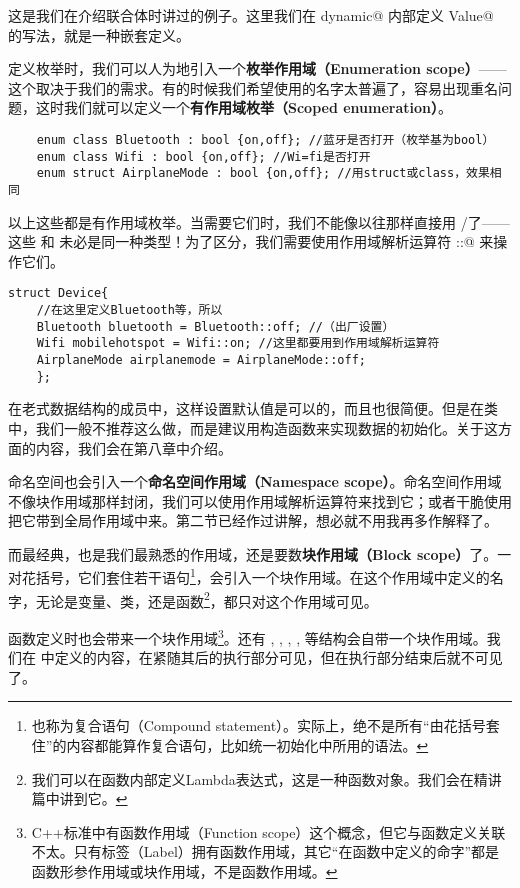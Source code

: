这是我们在介绍联合体时讲过的例子。这里我们在 \lstinline@struct dynamic@ 内部定义 \lstinline@union Value@ 的写法，就是一种嵌套定义。\par
定义枚举时，我们可以人为地引入一个\textbf{枚举作用域（Enumeration scope）}——这个取决于我们的需求。有的时候我们希望使用的名字太普遍了，容易出现重名问题，这时我们就可以定义一个\textbf{有作用域枚举（Scoped enumeration）}。
\begin{lstlisting}
    enum class Bluetooth : bool {on,off}; //蓝牙是否打开（枚举基为bool）
    enum class Wifi : bool {on,off}; //Wi=fi是否打开
    enum struct AirplaneMode : bool {on,off}; //用struct或class，效果相同
\end{lstlisting}
以上这些都是有作用域枚举。当需要它们时，我们不能像以往那样直接用 \lstinline@on@/\lstinline@off@ 了——这些 \lstinline@on@ 和 \lstinline@off@ 未必是同一种类型！为了区分，我们需要使用作用域解析运算符 \lstinline@::@ 来操作它们。
\begin{lstlisting}
struct Device{
    //在这里定义Bluetooth等，所以
    Bluetooth bluetooth = Bluetooth::off; //（出厂设置）
    Wifi mobilehotspot = Wifi::on; //这里都要用到作用域解析运算符
    AirplaneMode airplanemode = AirplaneMode::off;
    };
\end{lstlisting}
在老式数据结构的成员中，这样设置默认值是可以的，而且也很简便。但是在类中，我们一般不推荐这么做，而是建议用构造函数来实现数据的初始化。关于这方面的内容，我们会在第八章中介绍。\par
命名空间也会引入一个\textbf{命名空间作用域（Namespace scope）}。命名空间作用域不像块作用域那样封闭，我们可以使用作用域解析运算符来找到它；或者干脆使用 \lstinline@using@ 把它带到全局作用域中来。第二节已经作过讲解，想必就不用我再多作解释了。\par
而最经典，也是我们最熟悉的作用域，还是要数\textbf{块作用域（Block scope）}了。一对花括号，它们套住若干语句\footnote{也称为复合语句（Compound statement）。实际上，绝不是所有``由花括号套住''的内容都能算作复合语句，比如统一初始化中所用的语法。}，会引入一个块作用域。在这个作用域中定义的名字，无论是变量、类，还是函数\footnote{我们可以在函数内部定义Lambda表达式，这是一种函数对象。我们会在精讲篇中讲到它。}，都只对这个作用域可见。\par
函数定义时也会带来一个块作用域\footnote{C++标准中有函数作用域（Function scope）这个概念，但它与函数定义关联不太。只有标签（Label）拥有函数作用域，其它``在函数中定义的命字''都是函数形参作用域或块作用域，不是函数作用域。}。还有 \lstinline@for@, \lstinline@while@, \lstinline@if@, \lstinline@else@, \lstinline@switch@ 等结构会自带一个块作用域。我们在 \lstinline@for@ 中定义的内容，在紧随其后的执行部分可见，但在执行部分结束后就不可见了。\par
